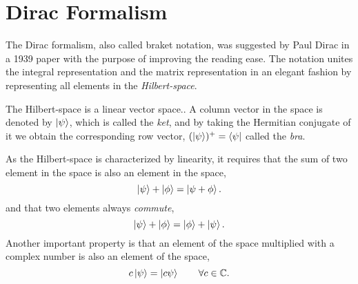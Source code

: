 \chapter{Dirac Formalism} \label{app:dirac}
The Dirac formalism, also called braket notation, was suggested by Paul Dirac in a 1939 paper with the purpose of improving the reading ease. \cite{dirac_new_1939} The notation unites the integral representation and the matrix representation in an elegant fashion by representing all elements in the \textit{Hilbert-space}. 

The Hilbert-space is a linear vector space.. A column vector in the space is denoted by $\ket{\psi}$, which is called the \textit{ket}, and by taking the Hermitian conjugate of it we obtain the corresponding row vector, $(\ket{\psi})^+=\bra{\psi}$ called the \textit{bra}. 

As the Hilbert-space is characterized by linearity, it requires that the sum of two element in the space is also an element in the space,
\begin{equation}
\ket{\psi}+\ket{\phi}=\ket{\psi+\phi}.
\end{equation}
and that two elements always \textit{commute},
\begin{equation}
\ket{\psi}+\ket{\phi}=\ket{\phi}+\ket{\psi}.
\end{equation}
Another important property is that an element of the space multiplied with a complex number is also an element of the space,
\begin{equation}
c\ket{\psi}=\ket{c\psi}\quad\quad\forall c\in\mathbb{C}.
\end{equation}

